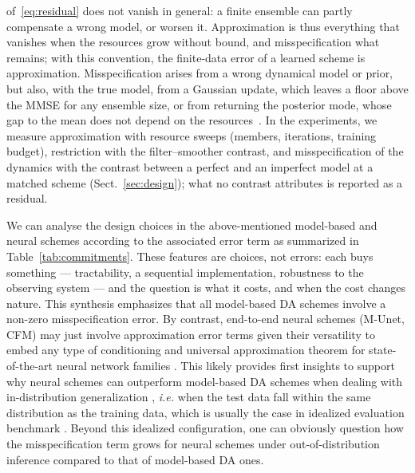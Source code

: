 of~\eqref{eq:residual} does not vanish in general: a finite ensemble can partly compensate
a wrong model, or worsen it. Approximation is thus everything that vanishes when the
resources grow without bound, and misspecification what remains; with this convention, the
finite-data error of a learned scheme is approximation. Misspecification arises from a
wrong dynamical model or prior, but also, with the true model, from a Gaussian update,
which leaves a floor above the MMSE for any ensemble size, or from returning the posterior
mode, whose gap to the mean does not depend on the resources~\cite{fablet_not_2026}. In
the experiments, we measure approximation with resource sweeps (members, iterations,
training budget), restriction with the filter--smoother contrast, and misspecification of
the dynamics with the contrast between a perfect and an imperfect model at a matched
scheme (Sect.~\ref{sec:design}); what no contrast attributes is reported as a residual.

We can analyse the design choices in the above-mentioned model-based and neural schemes according to the associated error term as summarized in Table~\ref{tab:commitments}. These features are choices, not errors: each buys something --- tractability,
a sequential implementation, robustness to the observing system --- and the
question is what it costs, and when the cost changes nature. This synthesis emphasizes that all model-based DA schemes involve a non-zero misspecification error. By contrast, end-to-end neural schemes (M-Unet, CFM) may just involve approximation error terms given their versatility to embed any type of conditioning and universal approximation theorem for state-of-the-art neural network families \cite{hornik_multilayer_1989,cybenko_approximation_1989}. This likely provides first insights to support why neural schemes can outperform model-based DA schemes when dealing with in-distribution generalization \cite{fablet_learning_2021,boudier_dan_2020}, {\em i.e.} when the test data fall within the same distribution as the training data, which is usually the case in idealized evaluation benchmark \cite{brajard_combining_2021,fablet_learning_2021,rozet_score-based_2023}. Beyond this idealized configuration, one can obviously question how the misspecification term grows for neural schemes under out-of-distribution inference compared to that of model-based DA ones.

